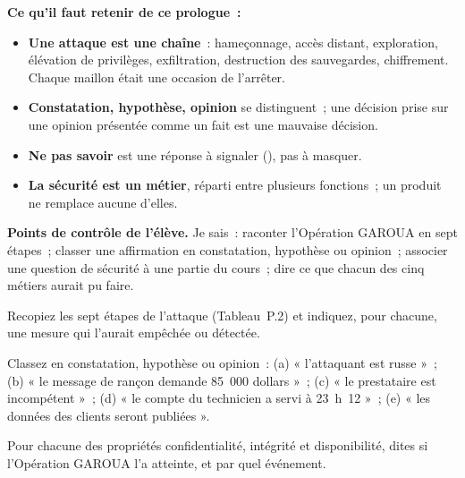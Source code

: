 \separateur

\begin{boxresume}
\textbf{Ce qu'il faut retenir de ce prologue~:}
\begin{itemize}
    \item \textbf{Une attaque est une chaîne}~: hameçonnage, accès distant,
          exploration, élévation de privilèges, exfiltration, destruction
          des sauvegardes, chiffrement. Chaque maillon était une occasion de
          l'arrêter.
    \item \textbf{Constatation, hypothèse, opinion} se distinguent~; une
          décision prise sur une opinion présentée comme un fait est une
          mauvaise décision.
    \item \textbf{Ne pas savoir} est une réponse à signaler (\NEK{}), pas à
          masquer.
    \item \textbf{La sécurité est un métier}, réparti entre plusieurs
          fonctions~; un produit ne remplace aucune d'elles.
\end{itemize}
\end{boxresume}

\begin{boxinfo}
\textbf{Points de contrôle de l'élève.} Je sais~: raconter l'Opération
GAROUA en sept étapes~; classer une affirmation en constatation, hypothèse
ou opinion~; associer une question de sécurité à une partie du cours~;
dire ce que chacun des cinq métiers aurait pu faire.
\end{boxinfo}

\bigskip

\begin{boxexo}[title={\ding{45}\quad Exercice~P.1. La chaîne d'attaque \niveaubase}]
Recopiez les sept étapes de l'attaque (Tableau~P.2) et indiquez, pour
chacune, une mesure qui l'aurait empêchée ou détectée.
\end{boxexo}

\begin{boxexo}[title={\ding{45}\quad Exercice~P.2. Trier les affirmations \niveaubase}]
Classez en constatation, hypothèse ou opinion~: (a) « l'attaquant est
russe »~; (b) « le message de rançon demande 85~000 dollars »~; (c) « le
prestataire est incompétent »~; (d) « le compte du technicien a servi à
23~h~12 »~; (e) « les données des clients seront publiées ».
\end{boxexo}

\begin{boxexo}[title={\ding{45}\quad Exercice~P.3. Ce qui a été atteint \niveaubase}]
Pour chacune des propriétés confidentialité, intégrité et disponibilité,
dites si l'Opération GAROUA l'a atteinte, et par quel événement.
\end{boxexo}

